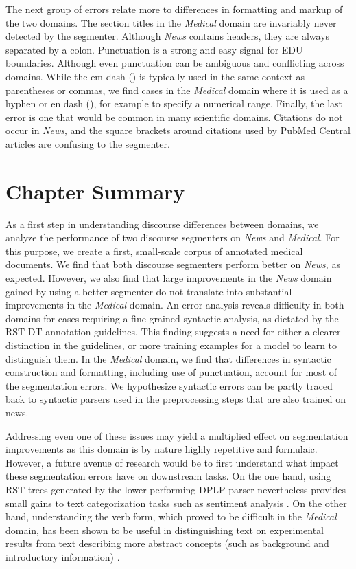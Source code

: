 The next group of errors relate more to differences in formatting and markup of the two domains. The section titles in the \textit{Medical} domain are invariably never detected by the segmenter. Although \textit{News} contains headers, they are always separated by a colon. Punctuation is a strong and easy signal for EDU boundaries. Although even punctuation can be ambiguous and conflicting across domains. While the em dash (\lit{--}) is typically used in the same context as parentheses or commas, we find cases in the \textit{Medical} domain where it is used as a hyphen or en dash (\lit{-}), for example to specify a numerical range. Finally, the last error is one that would be common in many scientific domains. Citations do not occur in \textit{News}, and the square brackets around citations used by PubMed Central articles are confusing to the segmenter.

\section{Chapter Summary}
As a first step in understanding discourse differences between domains, we analyze the performance of two discourse segmenters on \textit{News} and \textit{Medical}. For this purpose, we create a first, small-scale corpus of annotated medical documents. We find that both discourse segmenters perform better on \textit{News}, as expected. However, we also find that large improvements in the \textit{News} domain gained by using a better segmenter do not translate into substantial improvements in the \textit{Medical} domain. An error analysis reveals difficulty in both domains for cases requiring a fine-grained syntactic analysis, as dictated by the RST-DT annotation guidelines. This finding suggests a need for either a clearer distinction in the guidelines, or more training examples for a model to learn to distinguish them. In the \textit{Medical} domain, we find that differences in syntactic construction and formatting, including use of punctuation, account for most of the segmentation errors. We hypothesize syntactic errors can be partly traced back to syntactic parsers used in the preprocessing steps that are also trained on news.

Addressing even one of these issues may yield a multiplied effect on segmentation improvements as this domain is by nature highly repetitive and formulaic. However, a future avenue of research would be to first understand what impact these segmentation errors have on downstream tasks. On the one hand, using RST trees generated by the lower-performing \textsc{DPLP} parser nevertheless provides small gains to text categorization tasks such as sentiment analysis \cite{Ji:2017}. On the other hand, understanding the verb form, which proved to be difficult in the \textit{Medical} domain, has been shown to be useful in distinguishing text on experimental results from text describing more abstract concepts (such as background and introductory information) \cite{deWaard:2012}.

